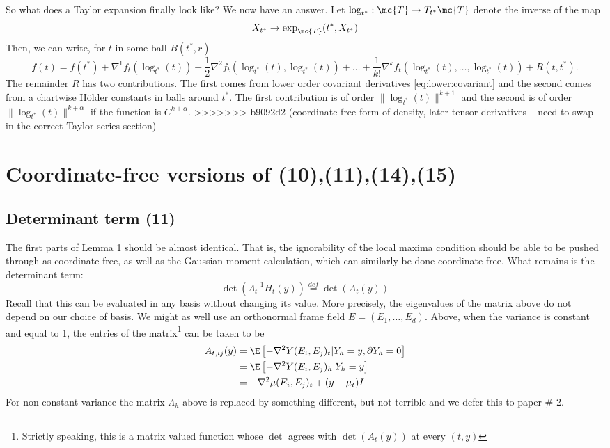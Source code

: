 \documentclass{article}
\begin{document}
So what does a Taylor expansion finally look like? We now have an answer. Let $\log_{t^*}:\mc{T} \rightarrow
T_{t^*}\mc{T}$ denote the inverse of the map
$$
X_{t^*} \to \exp_{\mc{T}}(t^*, X_{t^*})
$$
Then, we can write, for $t$ in some ball $B(t^*,r)$
$$
f(t) = f(t^*) + \nabla^1 f_t(\log_{t^*}(t)) + \frac{1}{2} \nabla^2 f_t(\log_{t^*}(t), \log_{t^*}(t))
+ \dots + \frac{1}{k!} \nabla^k f_t(\log_{t^*}(t), \dots, \log_{t^*}(t)) + R(t,t^*).
$$
The remainder $R$ has two contributions. The first comes from lower order
covariant derivatives \eqref{eq:lower:covariant} and the second comes from a chartwise H\"older constants
in balls around $t^*$. The first contribution is of order $\|\log_{t^*}(t)\|^{k+1}$ and
the second is of order $\|\log_{t^*}(t)\|^{k+\alpha}$ if the function is $C^{k+\alpha}$.
>>>>>>> b9092d2 (coordinate free form of density, later tensor derivatives -- need to swap in the correct Taylor series section)

\section{Coordinate-free versions of (10),(11),(14),(15)}

\subsection{Determinant term (11)}

The first parts of Lemma 1 should be almost identical. That is, the ignorability
of the local maxima condition should be able to be pushed through as coordinate-free,
as well as the Gaussian moment calculation, which can similarly be done coordinate-free. What remains is the determinant term:
$$
\det(\Lambda_t^{-1} H_t(y)) \overset{def}{=} \det(A_t(y))
$$
Recall that this can be evaluated in any basis without changing its value. More precisely, the eigenvalues
of the matrix above do not depend on our choice of basis.
We might as well use an orthonormal frame field $E=(E_1, \dots, E_d)$.
Above, when the variance is constant and equal to 1, the entries of the matrix\footnote{Strictly speaking, this is a matrix valued function whose $\det$ agrees with $\det(A_t(y))$ at every $(t,y)$} can be taken to be
$$
\begin{aligned}
A_{t,ij}(y) &= \E \left[-\nabla^2 Y(E_i, E_j)_t | Y_h=y, \partial Y_h=0\right] \\
&= \E \left[-\nabla^2 Y(E_i, E_j)_h | Y_h=y\right] \\
&= - \nabla^2 \mu(E_i, E_j)_t + (y - \mu_t) I \\
\end{aligned}
$$
For non-constant variance the matrix $\Lambda_h$ above is replaced by something different, but not terrible and we defer this to paper \# 2.
\end{document}

